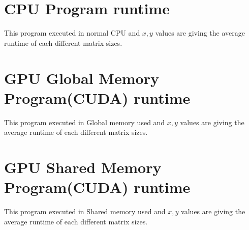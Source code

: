 \documentclass[12pt,oneside,a4paper]{article}
\title{\titlefont{Matrix Multiplication RunTime Graphs}}
\author{M.L.R.Yasara (CST140048)}
\begin{document}
	\maketitle

	\newpage

	\tableofcontents

	\newpage

	\section{CPU Program runtime}

	\par
	This program executed in normal CPU and $x,y$ values are giving the average runtime of each different matrix sizes.
	\hfill \break


	\newpage

	\section{GPU Global Memory Program(CUDA) runtime}

	\par
	This program executed in Global memory used and $x,y$ values are giving the average runtime of each different matrix sizes.
	\hfill \break


	\newpage

	\section{GPU Shared Memory Program(CUDA) runtime}

	\par
	This program executed in Shared memory used and $x,y$ values are giving the average runtime of each different matrix sizes.
	\hfill \break
\end{document}
